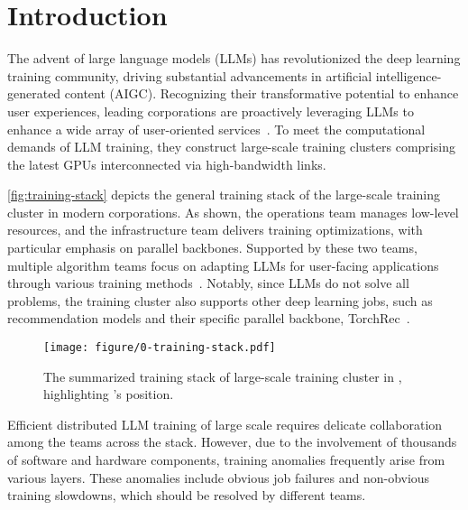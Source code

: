 \section{Introduction}

The advent of large language models (LLMs) has revolutionized the deep learning training community, driving substantial advancements in artificial intelligence-generated content (AIGC). Recognizing their transformative potential to enhance user experiences, leading corporations are proactively leveraging LLMs to enhance a wide array of user-oriented services~\cite{antgroup, jiangMegaScaleScaling,dongBoostingLargescale}.
To meet the computational demands of LLM training, they construct large-scale training clusters comprising the latest GPUs interconnected via high-bandwidth links.

\autoref{fig:training-stack} depicts the general training stack of the large-scale training cluster in modern corporations. As shown, the operations team manages low-level resources, and the infrastructure team delivers training optimizations\cite{cublas2024,nccl2024,daoFlashAttentionFast,paszkePyTorchImperative}, with particular emphasis on parallel backbones\cite{zhaoPyTorchFSDP,shoeybiMegatronLMTraining,rajbhandariZeROMemory}.
Supported by these two teams, multiple algorithm teams focus on adapting LLMs for user-facing applications through various training methods~\cite{shengHybridFlowFlexible,hanParameterEfficientFineTuning}. Notably, since LLMs do not solve all problems, the training cluster also supports other deep learning jobs, such as recommendation models and their specific parallel backbone, TorchRec~\cite{ivchenkoTorchRecPyTorch}.


\begin{figure}
    \centering
    \texttt{[image: figure/0-training-stack.pdf]}
    \caption{The summarized training stack of large-scale training cluster in \groupname{}, highlighting \sysname{}’s position.}
    \label{fig:training-stack}
    \vspace{-4mm}
\end{figure}

Efficient distributed LLM training of large scale requires delicate collaboration among the teams across the stack. However, due to the involvement of thousands of software and hardware components, training anomalies frequently arise from various layers. These anomalies include obvious job failures and non-obvious training slowdowns, which should be resolved by different teams. 

